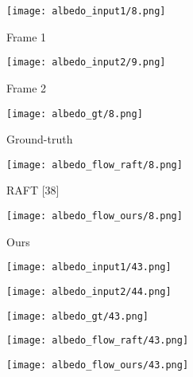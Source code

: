\documentclass[10pt,twocolumn,letterpaper]{article}
\begin{document}
\begin{figure*}[ht!]
     \centering
     \begin{subfigure}[b]{0.195\textwidth}
         \centering
         \caption*{Frame 1}
         \texttt{[image: albedo\_input1/8.png]}
     \end{subfigure}\hfill
     \begin{subfigure}[b]{0.195\textwidth}
         \centering
         \caption*{Frame 2}
         \texttt{[image: albedo\_input2/9.png]}
     \end{subfigure}\hfill
     \begin{subfigure}[b]{0.195\textwidth}
         \centering
         \caption*{Ground-truth}
         \texttt{[image: albedo\_gt/8.png]}
     \end{subfigure}\hfill
     \begin{subfigure}[b]{0.195\textwidth}
         \centering
         \caption*{RAFT [38]}
         \texttt{[image: albedo\_flow\_raft/8.png]}
     \end{subfigure}\hfill
     \begin{subfigure}[b]{0.195\textwidth}
         \centering
         \caption*{Ours}
         \texttt{[image: albedo\_flow\_ours/8.png]}
     \end{subfigure}

     \begin{subfigure}[b]{0.195\textwidth}
         \centering
         \texttt{[image: albedo\_input1/43.png]}
     \end{subfigure}\hfill
     \begin{subfigure}[b]{0.195\textwidth}
         \centering
         \texttt{[image: albedo\_input2/44.png]}
     \end{subfigure}\hfill
     \begin{subfigure}[b]{0.195\textwidth}
         \centering
         \texttt{[image: albedo\_gt/43.png]}
     \end{subfigure}\hfill
     \begin{subfigure}[b]{0.195\textwidth}
         \centering
         \texttt{[image: albedo\_flow\_raft/43.png]}
     \end{subfigure}\hfill
     \begin{subfigure}[b]{0.195\textwidth}
         \centering
         \texttt{[image: albedo\_flow\_ours/43.png]}
     \end{subfigure}


\end{figure*}
\end{document}
